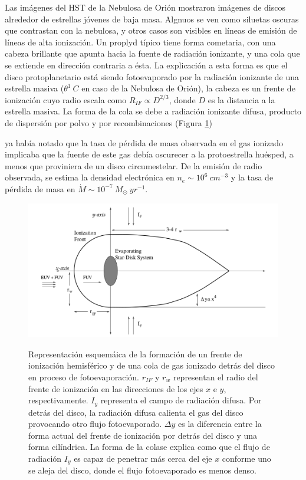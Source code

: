Las imágenes del HST de la Nebulosa de Orión mostraron imágenes de discos
alrededor de estrellas jóvenes de baja masa. Algnuos se ven como siluetas
oscuras que contrastan con la nebulosa, y otros casos son visibles en
líneas de emisión de líneas de alta ionización. Un proplyd típico tiene forma
cometaria, con una cabeza brillante que apunta hacia la fuente de radiación
ionizante, y una cola que se extiende en dirección contraria a ésta. La explicación
a esta forma es que el disco protoplanetario está siendo fotoevaporado por la
radiación ionizante de una estrella masiva ($\theta^1~C$ en caso de la Nebulosa
de Orión), la cabeza es un frente de ionización cuyo radio escala como
$R_{IF} \propto D^{2/3}$, donde $D$ es la distancia a la estrella masiva. La forma
de la cola se debe a radiación ionizante difusa, producto de dispersión por polvo
y por recombinaciones (Figura \ref{fig:prop-shape})

\citet{churchwell:1987} ya había notado que la tasa de pérdida de masa observada
en el gas ionizado implicaba que la fuente de este gas debía oscurecer a la
protoestrella huésped, a menos que proviniera de un disco circumestelar. De la
emisión de radio observada, se estima la densidad electrónica en
$n_e \sim 10^6~cm^{-3}$ y la tasa de pérdida de masa en
$\dot{M} \sim 10^{-7}~M_\odot~yr^{-1}$.

\begin{figure}
  \includegraphics[width=0.8\linewidth]{./Figures/Johnstone-shape}
  \label{fig:prop-shape}
  \caption{Representación esquemáica de la formación de un frente de ionización
    hemisférico y de una cola de gas ionizado detrás del disco en proceso de
    fotoevaporación. $r_{IF}$ y $r_w$ representan el radio del frente de ionización
    en las direcciones de los ejes $x$ e $y$, respectivamente. $I_y$ representa el
    campo de radiación difusa. Por detrás del disco, la radiación difusa calienta el
    gas del disco provocando otro flujo fotoevaporado. $\Delta y$ es la diferencia
    entre la forma actual del frente de ionización por detrás del disco y una forma
    cilíndrica. La forma de la colase explica como que el flujo de radiación $I_y$
    es capaz de penetrar más cerca del eje $x$ conforme uno se aleja del disco, donde
    el flujo fotoevaporado es menos denso.}
\end{figure}


